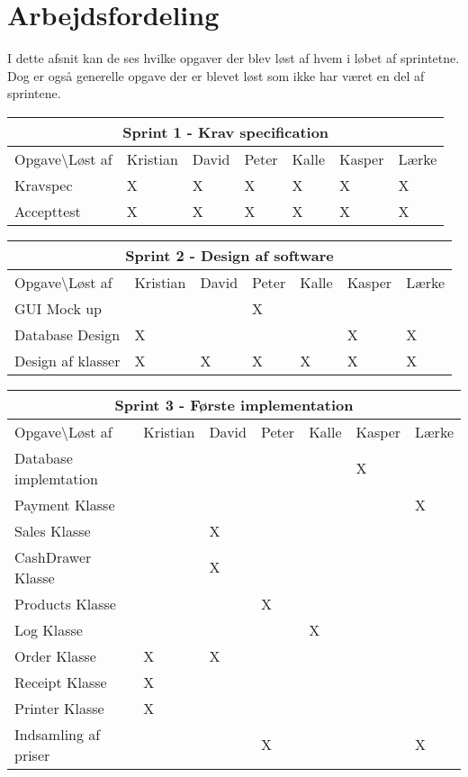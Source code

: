 \chapter{Arbejdsfordeling}

\newcommand{\SprintTabel}[2]
{
\begin{table}[H]
\centering
\begin{tabularx}{\textwidth}{|l|>{\centering\arraybackslash}X|>{\centering\arraybackslash}X|>{\centering\arraybackslash}X|>{\centering\arraybackslash}X|>{\centering\arraybackslash}X|>{\centering\arraybackslash}X|}
\hline
\multicolumn{7}{|c|}{\large{\textbf{Sprint #1}}} \\\hline
Opgave\textbackslash Løst af & Kristian & David & Peter & Kalle & Kasper & Lærke \\ \hline
#2 \hline
\end{tabularx}
\end{table}
}

I dette afsnit kan de ses hvilke opgaver der blev løst af hvem i løbet af sprintetne. Dog er også generelle opgave der er blevet løst som ikke har været en del af sprintene.

\SprintTabel{1 - Krav specification}
{
Kravspec & X & X & X & X & X & X \\\hline
Accepttest & X & X & X & X & X & X \\
}

\SprintTabel{2 - Design af software}
{
GUI Mock up & & & X & & & \\\hline
Database Design & X & & & & X & X \\\hline
Design af klasser & X & X & X & X & X & X \\
}

\SprintTabel{3 - Første implementation}
{
Database implemtation & & & & & X & \\\hline
Payment Klasse & & & & & & X \\\hline
Sales Klasse & & X & & & & \\\hline
CashDrawer Klasse & & X & & & & \\\hline
Products Klasse & & & X & & &  \\\hline
Log Klasse & & & & X &  &  \\\hline
Order Klasse & X & X & & & & \\\hline
Receipt Klasse & X & & & & & \\\hline
Printer Klasse & X & & & & & \\\hline
Indsamling af priser & & & X & & & X \\
}

